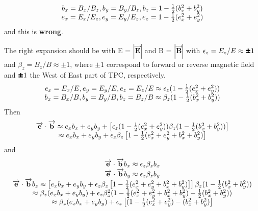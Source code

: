 \documentclass[12pt]{article} %
\newcommand{\Mypm}{\mathbin{\tikz [x=1.4ex,y=1.4ex,line width=.3ex] \draw (0.0,0) -- (1.0,0) (0.5,0.08) -- (0.5,0.92) (0.0,0.5) -- (1.0,0.5);}}%
\begin{document}
\begin{equation*} 
\begin{matrix}
b_{x} = B_{x}/B_{z}, b_{y} = B_{y}/B_{z}, b_{z} = 1 - \frac{1}{2}( b_{x}^2 + b_{y}^2) \cr
e_{x} = E_{x}/E_{z}, e_{y} = E_{y}/E_{z}, e_{z} = 1 - \frac{1}{2}( e_{x}^2 + e_{y}^2) \cr
\end{matrix}
\end{equation*}
and this is {\bf wrong}.
\par
The right expansion should be with 
E = $ \left|\overrightarrow{\mathbf{E}} \right| $ and 
B = $ \left|\overrightarrow{\mathbf{B}} \right| $
with $\epsilon_{z} = E_{z} / E \approx \Mypm 1$ and $\beta_{z} = B_{z} / B \approx \pm 1$,
where $\pm 1$ correspond to forward or reverse magnetic field and $\mathbf{\Mypm} 1$ the West of East part of TPC, respectively.
\begin{equation*} 
\begin{matrix}
e_{x} = E_{x}/E, e_{y} = E_{y}/E, e_{z} = E_{z}/E \approx \epsilon_{z}  (1 - \frac{1}{2}( e_{x}^2 + e_{y}^2)) \cr %
b_{x} = B_{x}/B, b_{y} = B_{y}/B, b_{z} = B_{z}/B \approx \beta_{z}     (1 - \frac{1}{2}( b_{x}^2 + b_{y}^2)) \cr %
\end{matrix}
\end{equation*}
Then 
\begin{equation*} 
\begin{matrix}
\overrightarrow{\mathbf{e}} \cdot \overrightarrow{\mathbf{b}} \approx 
e_{x} b_{x} + e_{y} b_{y} +
\left[ \epsilon_{z}  (1 - \frac{1}{2}( e_{x}^2 + e_{y}^2)) \beta_{z}     (1 - \frac{1}{2}( b_{x}^2 + b_{y}^2))\right] \cr
\approx e_{x} b_{x} + e_{y} b_{y} + \epsilon_{z}  \beta_{z} \left[ 1 - \frac{1}{2}(e_{x}^2 + e_{y}^2 +  b_{x}^2 + b_{y}^2) \right] \cr
\end{matrix}
\end{equation*}
and
\begin{equation*} 
\begin{matrix}
\overrightarrow{\mathbf{e}} \cdot \overrightarrow{\mathbf{b}} b_{x} \approx %
\epsilon_{z}  \beta_{z} b_{x} \cr
\overrightarrow{\mathbf{e}} \cdot \overrightarrow{\mathbf{b}} b_{y} \approx %
\epsilon_{z}  \beta_{z} b_{y} \cr
\overrightarrow{\mathbf{e}} \cdot \overrightarrow{\mathbf{b}} b_{z} \approx 
\left[  e_{x} b_{x} + e_{y} b_{y} + \epsilon_{z}  \beta_{z} \left[ 1 - \frac{1}{2}(e_{x}^2 + e_{y}^2 +  b_{x}^2 + b_{y}^2) \right] \right]
\beta_{z}     (1 - \frac{1}{2}( b_{x}^2 + b_{y}^2)) \cr
\approx \beta_{z} (e_{x} b_{x} + e_{y} b_{y}) + 
\epsilon_{z} \beta_{z}^{2} (1  - \frac{1}{2}(e_{x}^2 + e_{y}^2 +  b_{x}^2 + b_{y}^2) - \frac{1}{2}( b_{x}^2 + b_{y}^2))
\cr
\approx %
\beta_{z} (e_{x} b_{x} + e_{y} b_{y}) + \epsilon_{z} \left[ (1  - \frac{1}{2}(e_{x}^2 + e_{y}^2) - ( b_{x}^2 + b_{y}^2) \right]
\cr
\end{matrix}
\end{equation*}
\end{document}
